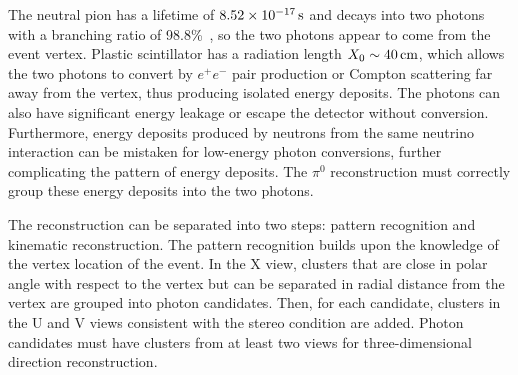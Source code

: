 The neutral pion has a lifetime of $\unit[8.52\times10^{-17}]{s}$ and decays
into two photons with a branching ratio of 98.8\%~\cite{pdg}, so the two photons appear
to come from the event vertex. 
Plastic scintillator has a radiation length $X_0\sim\unit[40]{cm}$, which
allows the two photons to convert by $e^+e^-$ pair production or Compton
scattering 
far away from the vertex, thus producing isolated energy deposits. 
The photons can also have significant energy leakage or escape the detector
without conversion. 
Furthermore, energy deposits produced by neutrons from the same neutrino
interaction can be mistaken for low-energy photon conversions, further
complicating the pattern of energy deposits. 
The $\pi^0$ reconstruction must correctly group these energy deposits into
the two photons. 


The reconstruction can be separated into two steps: pattern recognition and
kinematic reconstruction. The pattern recognition builds upon the knowledge of the vertex
location of the event. In the X view, clusters that are close in polar angle with respect to
the vertex but can be
separated in radial distance from the vertex are grouped into photon candidates. 
Then, for each candidate, clusters in the U and V views consistent with the stereo condition are added. 
Photon candidates must have clusters from at least two views
for three-dimensional direction reconstruction.


